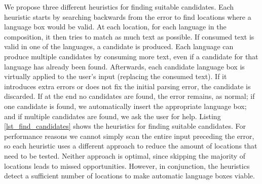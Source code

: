 \documentclass[sigplan,screen]{acmart}\settopmatter{printfolios=true,printccs=false,printacmref=false}
\begin{document}
We propose three different heuristics for finding suitable candidates. Each heuristic
starts by searching backwards from the error to find locations where a
language box would be valid. At each location, for each language in the composition,
it then tries to match as much text as possible. If consumed text is valid in one
of the languages, a candidate is produced. Each language can produce multiple
candidates by consuming more text, even if a candidate for that language has
already been found. Afterwards, each candidate language box is virtually
applied to the user's input (replacing the consumed text). If it introduces
extra errors or does not fix the initial parsing error, the candidate is
discarded. If at the end no candidates are found, the error
remains, as normal; if one candidate is found, we automatically insert the
appropriate language box; and if multiple candidates are found, we ask the user
for help.
Listing \ref{lst_find_candidates} shows the heuristics for finding suitable
candidates.
For performance reasons we cannot simply scan the entire input preceding the error,
so each heuristic uses a different approach to reduce the amount of locations that
need to be tested. Neither approach is optimal, since skipping the majority of locations
leads to missed opportunities. However, in conjunction, the heuristics detect a sufficient
number of locations to make automatic language boxes viable.
\end{document}
